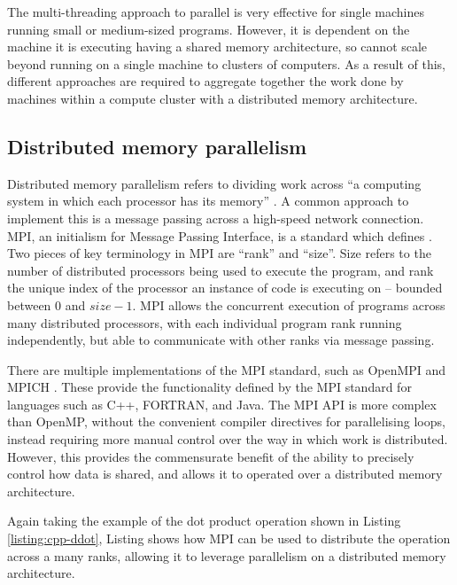 The multi-threading approach to parallel is very effective for single machines running small or medium-sized programs. However, it is dependent on the machine it is executing having a shared memory architecture, so cannot scale beyond running on a single machine to clusters of computers. As a result of this, different approaches are required to aggregate together the work done by machines within a compute cluster with a distributed memory architecture.

\subsection{Distributed memory parallelism}
\label{ssec:distributed-memory-paralellism}

Distributed memory parallelism refers to dividing work across ``a computing system in which each processor has its memory'' \cite{pardo2021modeling}. A common approach to implement this is a message passing across a high-speed network connection. MPI, an initialism for Message Passing Interface, is a standard which defines \cite{thempiforumMPIMessagePassing1993}.
Two pieces of key terminology in MPI are ``rank'' and ``size''. Size refers to the number of distributed processors being used to execute the program, and rank the unique index of the processor an instance of code is executing on -- bounded between $0$ and $size-1$. MPI allows the concurrent execution of programs across many distributed processors, with each individual program rank running independently, but able to communicate with other ranks via message passing.

There are multiple implementations of the MPI standard, such as OpenMPI \cite{gabriel2004open} and MPICH \cite{gropp1996user}. These provide the functionality defined by the MPI standard for languages such as C++, FORTRAN, and Java. The MPI API is more complex than OpenMP, without the convenient compiler directives for parallelising loops, instead requiring more manual control over the way in which work is distributed. However, this provides the commensurate benefit of the ability to precisely control how data is shared, and allows it to operated over a distributed memory architecture.

Again taking the example of the dot product operation shown in Listing \ref{listing:cpp-ddot}, Listing \label{listing:cpp-ddot-mpi} shows how MPI can be used to distribute the operation across a many ranks, allowing it to leverage parallelism on a distributed memory architecture.

